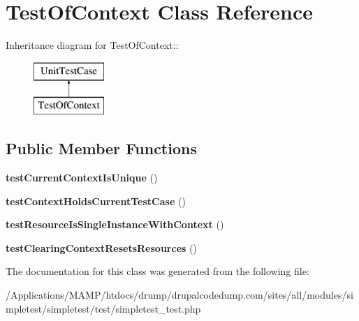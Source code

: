 \hypertarget{class_test_of_context}{
\section{TestOfContext Class Reference}
\label{class_test_of_context}
}
Inheritance diagram for TestOfContext::\begin{figure}[H]
\begin{center}
\leavevmode
\includegraphics[height=2cm]{class_test_of_context}
\end{center}
\end{figure}
\subsection*{Public Member Functions}
\begin{DoxyCompactItemize}
\item 
\hypertarget{class_test_of_context_ace4ed79548cc9442e0f941b7fab7fe59}{
{\bfseries testCurrentContextIsUnique} ()}
\label{class_test_of_context_ace4ed79548cc9442e0f941b7fab7fe59}

\item 
\hypertarget{class_test_of_context_a62b906350b3ea4d7e8476db7cdc06790}{
{\bfseries testContextHoldsCurrentTestCase} ()}
\label{class_test_of_context_a62b906350b3ea4d7e8476db7cdc06790}

\item 
\hypertarget{class_test_of_context_a79dfc75ea02f1a619bfedf78209acd51}{
{\bfseries testResourceIsSingleInstanceWithContext} ()}
\label{class_test_of_context_a79dfc75ea02f1a619bfedf78209acd51}

\item 
\hypertarget{class_test_of_context_a3788dc2a1c5932af188dd6a818a7060e}{
{\bfseries testClearingContextResetsResources} ()}
\label{class_test_of_context_a3788dc2a1c5932af188dd6a818a7060e}

\end{DoxyCompactItemize}


The documentation for this class was generated from the following file:\begin{DoxyCompactItemize}
\item 
/Applications/MAMP/htdocs/drump/drupalcodedump.com/sites/all/modules/simpletest/simpletest/test/simpletest\_\-test.php\end{DoxyCompactItemize}
